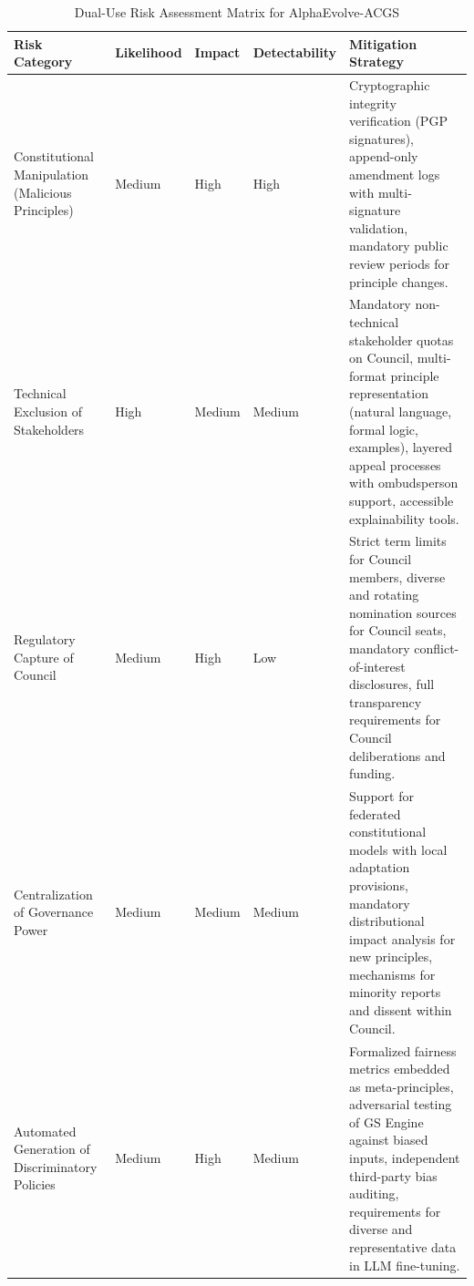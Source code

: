 \documentclass[manuscript,screen,review,anonymous,9pt]{acmart}
\newcommand{\tablesize}{\footnotesize} %
\newcommand{\tableheader}[1]{\textbf{#1}}
\begin{document}
\begin{table}[htbp]
    \centering
    \caption{Dual-Use Risk Assessment Matrix for AlphaEvolve-ACGS}
    \label{tab:risk_assessment}
    \tablesize
    \begin{tabular}{@{}p{2.2cm}p{1.2cm}p{1.2cm}p{1.2cm}p{3.8cm}@{}} %
        \toprule
        \tableheader{Risk Category} & \tableheader{Likelihood} & \tableheader{Impact} & \tableheader{Detectability} & \tableheader{Mitigation Strategy} \\
        \midrule
        Constitutional Manipulation (Malicious Principles) & Medium & High & High & Cryptographic integrity verification (PGP signatures), append-only amendment logs with multi-signature validation, mandatory public review periods for principle changes. \\
        \midrule
        Technical Exclusion of Stakeholders & High & Medium & Medium & Mandatory non-technical stakeholder quotas on Council, multi-format principle representation (natural language, formal logic, examples), layered appeal processes with ombudsperson support, accessible explainability tools. \\
        \midrule
        Regulatory Capture of Council & Medium & High & Low & Strict term limits for Council members, diverse and rotating nomination sources for Council seats, mandatory conflict-of-interest disclosures, full transparency requirements for Council deliberations and funding. \\
        \midrule
        Centralization of Governance Power & Medium & Medium & Medium & Support for federated constitutional models with local adaptation provisions, mandatory distributional impact analysis for new principles, mechanisms for minority reports and dissent within Council. \\
        \midrule
        Automated Generation of Discriminatory Policies & Medium & High & Medium & Formalized fairness metrics embedded as meta-principles, adversarial testing of GS Engine against biased inputs, independent third-party bias auditing, requirements for diverse and representative data in LLM fine-tuning. \\
        \bottomrule
    \end{tabular}
\end{table}
\end{document}
